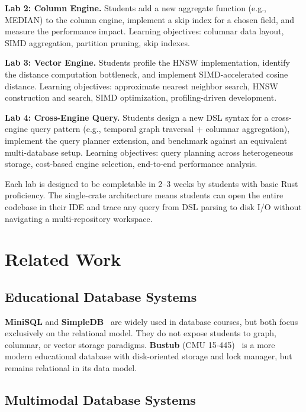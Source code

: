 \documentclass[11pt,a4paper]{article}
\begin{document}
\textbf{Lab 2: Column Engine.} Students add a new aggregate function
(e.g., MEDIAN) to the column engine, implement a skip index for a chosen
field, and measure the performance impact. Learning objectives: columnar
data layout, SIMD aggregation, partition pruning, skip indexes.

\textbf{Lab 3: Vector Engine.} Students profile the HNSW implementation,
identify the distance computation bottleneck, and implement SIMD-accelerated
cosine distance. Learning objectives: approximate nearest neighbor search,
HNSW construction and search, SIMD optimization, profiling-driven
development.

\textbf{Lab 4: Cross-Engine Query.} Students design a new DSL syntax for a
cross-engine query pattern (e.g., temporal graph traversal + columnar
aggregation), implement the query planner extension, and benchmark against
an equivalent multi-database setup. Learning objectives: query planning
across heterogeneous storage, cost-based engine selection, end-to-end
performance analysis.

Each lab is designed to be completable in 2--3 weeks by students with basic
Rust proficiency. The single-crate architecture means students can open the
entire codebase in their IDE and trace any query from DSL parsing to disk
I/O without navigating a multi-repository workspace.

\section{Related Work}

\subsection{Educational Database Systems}

\textbf{MiniSQL} and \textbf{SimpleDB}~\cite{sciore2007} are widely used in
database courses, but both focus exclusively on the relational model. They
do not expose students to graph, columnar, or vector storage paradigms.
\textbf{Bustub} (CMU 15-445)~\cite{pavlo2023} is a more modern educational
database with disk-oriented storage and lock manager, but remains relational
in its data model.

\subsection{Multimodal Database Systems}
\end{document}
